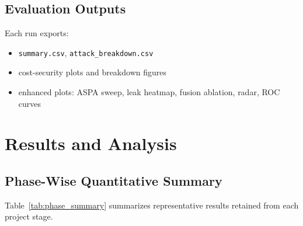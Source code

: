 \documentclass[conference]{IEEEtran}
\begin{document}
\subsection{Evaluation Outputs}
Each run exports:
\begin{itemize}
\item \texttt{summary.csv}, \texttt{attack\_breakdown.csv}
\item cost-security plots and breakdown figures
\item enhanced plots: ASPA sweep, leak heatmap, fusion ablation, radar, ROC curves
\end{itemize}

\section{Results and Analysis}
\subsection{Phase-Wise Quantitative Summary}
Table~\ref{tab:phase_summary} summarizes representative results retained from each project stage.
\end{document}
